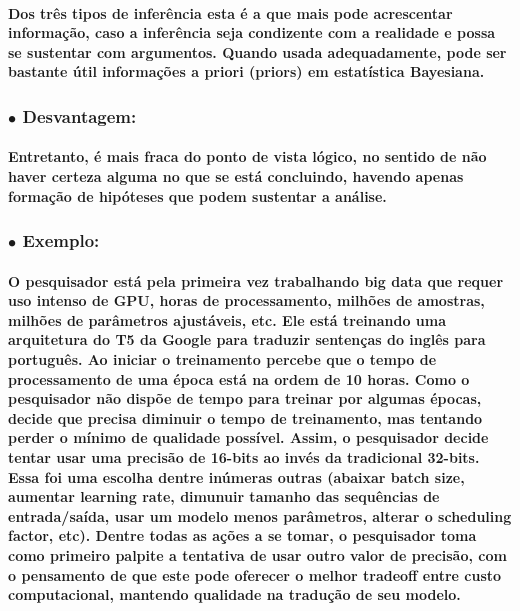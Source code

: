 \documentclass[a4paper]{article}    %
\begin{document}
\paragraph{Dos três tipos de inferência esta é a que mais pode acrescentar informação, caso a inferência seja condizente com a realidade e possa se sustentar com argumentos. Quando usada adequadamente, pode ser bastante útil informações a priori (priors) em estatística Bayesiana.}

\subsubsection*{\hspace{5mm}$\bullet$ Desvantagem:}
\paragraph{Entretanto, é mais fraca do ponto de vista lógico, no sentido de não haver certeza alguma no que se está concluindo, havendo apenas formação de hipóteses que podem sustentar a análise.}

\subsubsection*{\hspace{5mm}$\bullet$ Exemplo:}
\paragraph{O pesquisador está pela primeira vez trabalhando big data que requer uso intenso de GPU, horas de processamento, milhões de amostras, milhões de parâmetros ajustáveis, etc. Ele está treinando uma arquitetura do T5 da Google para traduzir sentenças do inglês para português. Ao iniciar o treinamento percebe que o tempo de processamento de uma época está na ordem de 10 horas. Como o pesquisador não dispõe de tempo para treinar por algumas épocas, decide que precisa diminuir o tempo de treinamento, mas tentando perder o mínimo de qualidade possível. Assim, o pesquisador decide tentar usar uma precisão de 16-bits ao invés da tradicional 32-bits. Essa foi uma escolha dentre inúmeras outras (abaixar batch size, aumentar learning rate, dimunuir tamanho das sequências de entrada/saída, usar um modelo menos parâmetros, alterar o scheduling factor, etc). Dentre todas as ações a se tomar, o pesquisador toma como primeiro palpite a tentativa de usar outro valor de precisão, com o pensamento de que este pode oferecer o melhor tradeoff entre custo computacional, mantendo qualidade na tradução de seu modelo.}
\end{document}
